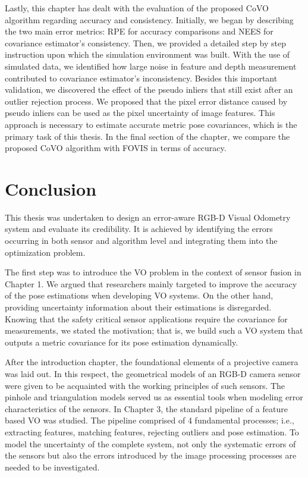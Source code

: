 \documentclass[a4paper]{report}
\numberwithin{figure}{section}
\begin{document}
Lastly, this chapter has dealt with the evaluation of the proposed CoVO algorithm
regarding accuracy and consistency. Initially, we began by describing the two
main error metrics: RPE for accuracy comparisons and NEES for covariance
estimator's consistency.  Then, we provided a detailed step by step instruction
upon which the simulation environment was built. With the use of simulated
data, we identified how large noise in feature and depth measurement
contributed to covariance estimator's inconsistency. Besides this important
validation, we discovered the effect of the pseudo inliers that still exist
after an outlier rejection process. We proposed that the pixel error distance
caused by pseudo inliers can be used as the pixel uncertainty of image
features. This approach is necessary to estimate accurate metric pose covariances, which
is the primary task of this thesis.  In the final section of the chapter, we
compare the proposed CoVO algorithm with FOVIS in terms of accuracy.

\chapter{Conclusion} \label{cp_conc}

This thesis was undertaken to design an error-aware RGB-D Visual Odometry
system and evaluate its credibility.  It is achieved by identifying the errors
occurring in both sensor and algorithm level and integrating them into the
optimization problem.

The first step was to introduce the VO problem in the context of sensor fusion
in Chapter 1. We argued that researchers mainly targeted to improve the
accuracy of the pose estimations when developing VO systems.  On the other
hand, providing uncertainty information about their estimations is disregarded.
Knowing that the safety critical sensor applications require the covariance for
measurements, we stated the motivation; that is, we build such a VO system that
outputs a metric covariance for its pose estimation dynamically. 

After the introduction chapter, the foundational elements of a projective
camera was laid out. 
In this respect, the geometrical models of an RGB-D camera sensor were given to
be acquainted with the working principles of such sensors.  The pinhole and
triangulation models served us as essential tools when modeling error
characteristics of the sensors.
In Chapter 3, the standard pipeline of a feature based VO was studied. The
pipeline comprised of 4 fundamental processes; i.e., extracting features,
matching features, rejecting outliers and pose estimation. To model the
uncertainty of the complete system, not only the systematic errors of the
sensors but also the errors introduced by the image processing processes are
needed to be investigated.
\end{document}
